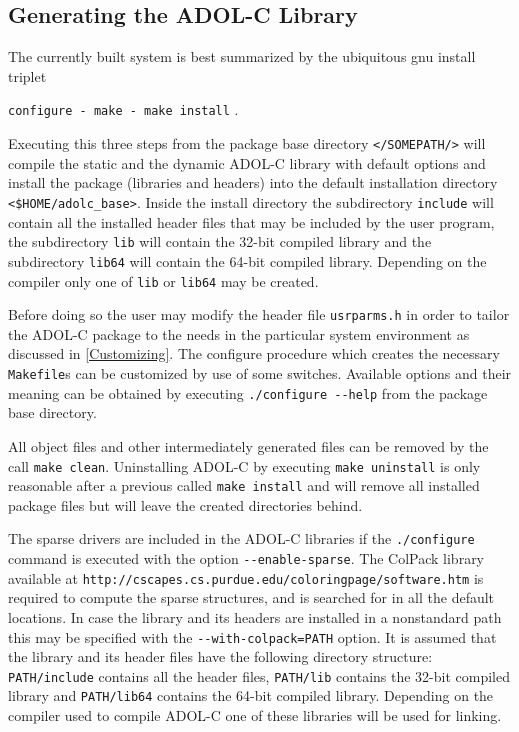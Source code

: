 \documentclass[11pt,twoside]{article}
\begin{document}
\subsection{Generating the ADOL-C Library}
\label{genlib}
%
The currently built system is best summarized by the ubiquitous gnu
install triplet 
\begin{center}
\verb=configure - make - make install= .
\end{center}
Executing this three steps from the package base directory
\verb=</SOMEPATH/=\texttt{\packagetar}\verb=>= will compile the static and the dynamic
ADOL-C library with default options and install the package (libraries
and headers) into the default installation directory {\tt
  \verb=<=\$HOME/adolc\_base\verb=>=}. Inside the install directory
the subdirectory \verb=include= will contain all the installed header
files that may be included by the user program, the subdirectory
\verb=lib= will contain the 32-bit compiled library 
and the subdirectory \verb=lib64= will contain the 64-bit compiled
library. Depending on the compiler only one of \verb=lib= or
\verb=lib64= may be created.

Before doing so the user may modify the header file \verb=usrparms.h=
in order to tailor the \mbox{ADOL-C} package to the needs in the
particular system environment as discussed in 
\autoref{Customizing}. The configure procedure which creates the necessary
\verb=Makefile=s can be customized by use of some switches. Available
options and their meaning can be obtained by executing
\verb=./configure --help= from the package base directory. 

All object files and other intermediately generated files can be
removed by the call \verb=make clean=. Uninstalling ADOL-C by
executing \verb=make uninstall= is only reasonable after a previous
called \verb=make install= and will remove all installed package files
but will leave the created directories behind. 

The sparse drivers are included in the ADOL-C libraries if the
\verb=./configure= command is executed with the option
\verb=--enable-sparse=. The ColPack library available at 
\verb=http://cscapes.cs.purdue.edu/coloringpage/software.htm= is required to
compute the sparse structures, and is searched for in all the default 
locations. 
In case the library and its headers are installed in a nonstandard path
this may be specified with the \verb?--with-colpack=PATH? option.
It is assumed that the library and its header files have the following
directory structure: \verb?PATH/include? contains all the header
files,
\verb?PATH/lib? contains the 32-bit compiled library and 
\verb?PATH/lib64? contains the 64-bit compiled library. Depending on
the compiler used to compile {\sf ADOL-C} one of these libraries will
be used for linking.
 
\end{document}
